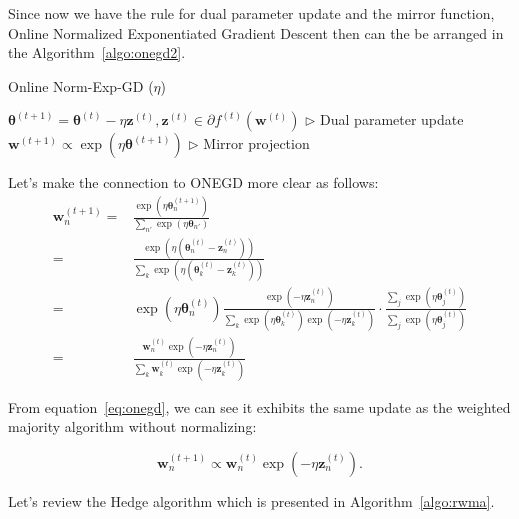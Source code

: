 \documentclass[11pt]{article}
\newcommand{\btheta}{\boldsymbol{\theta}}
\newcommand{\bz}{\boldsymbol{z}}
\newcommand{\bw}{\boldsymbol{w}}
\begin{document}
Since now we have the rule for dual parameter update and the mirror function, Online Normalized Exponentiated Gradient Descent then can the be arranged in the Algorithm~\ref{algo:onegd2}.

\begin{algorithm}[H]
\caption{Online Norm-Exp-GD ($\eta$)}
\label{algo:onegd2}
\begin{algorithmic}[1]
%
\STATE $\btheta^{(t+1)}  = \btheta^{(t)} - \eta \bz^{(t)},  \bz^{(t)} \in \partial f^{(t)}(\bw^{(t)})$ \hfill $\triangleright$ Dual parameter update
%
\STATE $\bw^{(t+1)} \propto \exp{(\eta \btheta^{(t+1)})}$ \hfill $\triangleright$ Mirror projection
%
\ENDFOR
\end{algorithmic}
\end{algorithm}

Let's make the connection to ONEGD more clear as follows:
\begin{align}\label{eq:onegd}
    \bw_n^{(t+1)} = &  \frac{\exp \left(\eta \btheta_n^{(t+1)}\right)}{\sum_{n'} \exp (\eta \btheta_{n'})} \nonumber \\
    = &  \frac{\exp \left(\eta (\btheta_n^{(t)} - \bz_n^{(t)})\right) }{\sum_{k} \exp \left( \eta (\btheta_k^{(t)} - \bz_k^{(t)}) \right)} \nonumber \\
    = & \exp (\eta \btheta_n^{(t)}) \frac{\exp (-\eta \bz_n^{(t)})}{\sum_k \exp (\eta \btheta_k^{(t)}) \exp (-\eta \bz_k^{(t)})} \cdot \frac{\sum_j \exp (\eta \btheta_j^{(t)})}{\sum_j \exp (\eta \btheta_j^{(t)})} \nonumber \\
    = & \frac{\bw_n^{(t)} \exp (-\eta \bz_n^{(t)})}{\sum_k \bw_k^{(t)} \exp (- \eta \bz_k^{(t)})}
\end{align}

From equation~\ref{eq:onegd}, we can see it exhibits the same update as the weighted majority algorithm without normalizing:

$$ \bw_n^{(t+1)} \propto \bw_n^{(t)} \exp (-\eta \bz_n^{(t)}).$$

Let's review the Hedge algorithm which is presented in Algorithm~\ref{algo:rwma}.
\end{document}
